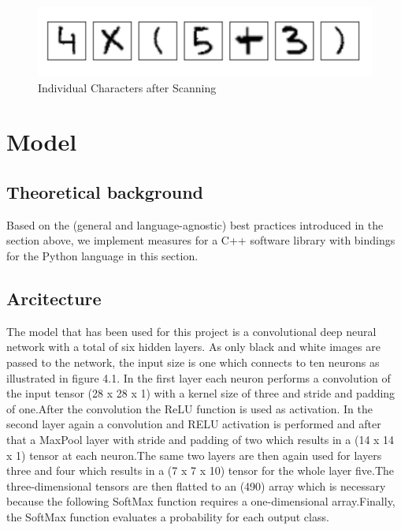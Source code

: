 \documentclass[@CLASSOPTIONS@]{tumarticle}
\begin{document}
\begin{figure}
    \begin{minipage}{0.48\textwidth}
     \centering
     \includegraphics[width=.9\linewidth]{figures/real_data_3}
     \caption{Individual Characters after Scanning}\label{Fig:Data6}
   \end{minipage}
\end{figure}

\section{Model}
\label{sec:implementation}

\subsection{Theoretical background}
Based on the (general and language-agnostic) best practices introduced in
the section above, we implement measures for a C++ software library with
bindings for the Python language in this section.

\subsection{Arcitecture}

The model that has been used for this project is a convolutional deep neural network with a total of six hidden layers.
As only black and white images are passed to the network, the input size is one which connects to ten neurons as
illustrated in figure 4.1. In the first layer each neuron performs a convolution of the input tensor (28 x 28 x 1) with
a kernel size of three and stride and padding of one.After the convolution the ReLU function is used as activation.
In the second layer again a convolution and RELU activation is performed and after that a MaxPool layer with stride and
padding of two which results in a (14 x 14 x 1) tensor at each neuron.The same two layers are then again used for
layers three and four which results in a (7 x 7 x 10) tensor for the whole layer five.The three-dimensional tensors are
then flatted to an (490) array which is necessary because the following SoftMax function requires a one-dimensional
array.Finally, the SoftMax function evaluates a probability for each output class.
\end{document}
